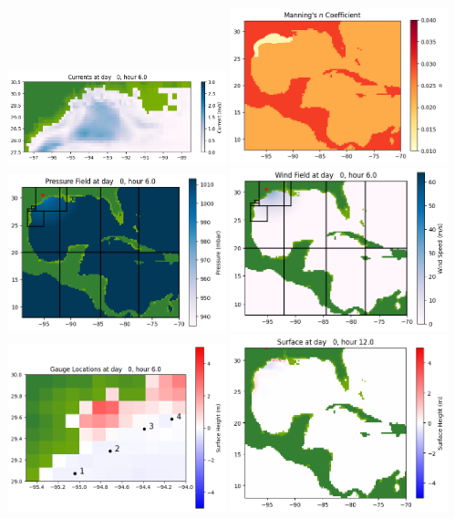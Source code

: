 \documentclass[11pt]{article}
\begin{document}
\includegraphics[width=0.475\textwidth]{frame0013fig1004.png}
\vskip 10pt 
\includegraphics[width=0.475\textwidth]{frame0013fig1005.png}
\includegraphics[width=0.475\textwidth]{frame0013fig1006.png}
\vskip 10pt 
\includegraphics[width=0.475\textwidth]{frame0013fig1007.png}
\includegraphics[width=0.475\textwidth]{frame0013fig1008.png}
\vskip 10pt 
\includegraphics[width=0.475\textwidth]{frame0014fig1001.png}
\end{document}
